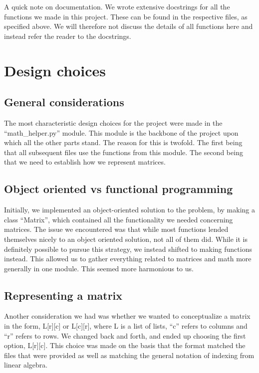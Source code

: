 \documentclass[letterpaper, 12 pt, conference]{ieeeconf}
\begin{document}
A quick note on documentation. We wrote extensive docstrings for all the functions we made in this project. These can be found in the respective files, as specified above. We will therefore not discuss the details of all functions here and instead refer the reader to the docstrings. 

\section{Design choices}

\subsection{General considerations}

The most characteristic design choices for the project were made in the “math\_helper.py” module. This module is the backbone of the project upon which all the other parts stand. The reason for this is twofold. The first being that all subsequent files use the functions from this module. The second being that we need to establish how we represent matrices.

\subsection{Object oriented vs functional programming}

Initially, we implemented an object-oriented solution to the problem, by making a class “Matrix”, which contained all the functionality we needed concerning matrices. The issue we encountered was that while most functions lended themselves nicely to an object oriented solution, not all of them did. While it is definitely possible to pursue this strategy, we instead shifted to making functions instead. This allowed us to gather everything related to matrices and math more generally in one module. This seemed more harmonious to us. 

\subsection{Representing a matrix}

Another consideration we had was whether we wanted to conceptualize a matrix in the form, L[r][c] or L[c][r], where L is a list of lists, “c” refers to columns and “r” refers to rows. We changed back and forth, and ended up choosing the first option, L[r][c]. This choice was made on the basis that the format matched the files that were provided as well as matching the general notation of indexing from linear algebra.
\end{document}

